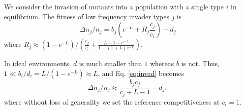 \documentclass[11pt]{article}
\begin{document}
We consider the invasion of mutants into a population with a single type $i$ in equilibrium. The fitness of low frequency invader types $j$ is
\begin{equation}
\Delta n_j/n_j = b_j \left(e^{-L}+R_j\frac{c_j}{c_i}\right)-d_j \label{eq:invad}
\end{equation}
where $R_j\approx (1-e^{-L})/\left(\frac{c_j}{c_i}+\frac{L-1-e^{-L}}{1-(1+L)e^{-L}}\right)$.

In ideal environments, $d$ is much smaller than $1$ whereas $b$ is not. Thus, $1 \ll b_i/d_i = L/(1-e^{-L}) \approx L$, and Eq. \eqref{eq:invad} becomes 
\begin{equation}
\Delta n_j/n_j \approx \frac{b_j c_j}{c_j + L-1}-d_j, \label{eq:invad}
\end{equation}
where without loss of generality we set the reference competitiveness at $c_i=1$.

\end{document}
